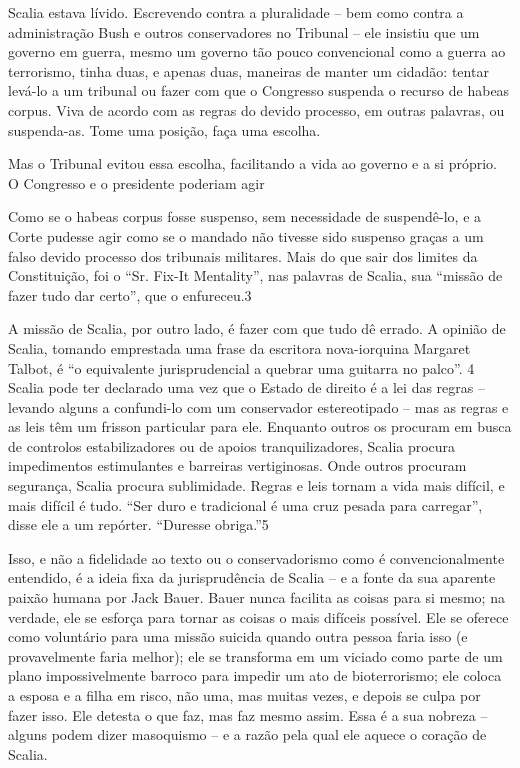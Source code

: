  \par 
Scalia estava lívido. Escrevendo contra a pluralidade – bem como contra a administração Bush e outros conservadores no Tribunal – ele insistiu que um governo em guerra, mesmo um governo tão pouco convencional como a guerra ao terrorismo, tinha duas, e apenas duas, maneiras de manter um cidadão: tentar levá-lo a um tribunal ou fazer com que o Congresso suspenda o recurso de habeas corpus. Viva de acordo com as regras do devido processo, em outras palavras, ou suspenda-as. Tome uma posição, faça uma escolha.
 \par 
Mas o Tribunal evitou essa escolha, facilitando a vida ao governo e a si próprio. O Congresso e o presidente poderiam agir
 \par 
Como se o habeas corpus fosse suspenso, sem necessidade de suspendê-lo, e a Corte pudesse agir como se o mandado não tivesse sido suspenso graças a um falso devido processo dos tribunais militares. Mais do que sair dos limites da Constituição, foi o “Sr. Fix-It Mentality”, nas palavras de Scalia, sua “missão de fazer tudo dar certo”, que o enfureceu.{\color{blue}3}
 \par 
A missão de Scalia, por outro lado, é fazer com que tudo dê errado. A opinião de Scalia, tomando emprestada uma frase da escritora nova-iorquina Margaret Talbot, é “o equivalente jurisprudencial a quebrar uma guitarra no palco”. {\color{blue}4} Scalia pode ter declarado uma vez que o Estado de direito é a lei das regras – levando alguns a confundi-lo com um conservador estereotipado – mas as regras e as leis têm um frisson particular para ele. Enquanto outros os procuram em busca de controlos estabilizadores ou de apoios tranquilizadores, Scalia procura impedimentos estimulantes e barreiras vertiginosas. Onde outros procuram segurança, Scalia procura sublimidade. Regras e leis tornam a vida mais difícil, e mais difícil é tudo. “Ser duro e tradicional é uma cruz pesada para carregar”, disse ele a um repórter. “Duresse obriga.”{\color{blue}5}
 \par 
Isso, e não a fidelidade ao texto ou o conservadorismo como é convencionalmente entendido, é a ideia fixa da jurisprudência de Scalia – e a fonte da sua aparente paixão humana por Jack Bauer. Bauer nunca facilita as coisas para si mesmo; na verdade, ele se esforça para tornar as coisas o mais difíceis possível. Ele se oferece como voluntário para uma missão suicida quando outra pessoa faria isso (e provavelmente faria melhor); ele se transforma em um viciado como parte de um plano impossivelmente barroco para impedir um ato de bioterrorismo; ele coloca a esposa e a filha em risco, não uma, mas muitas vezes, e depois se culpa por fazer isso. Ele detesta o que faz, mas faz mesmo assim. Essa é a sua nobreza – alguns podem dizer masoquismo – e a razão pela qual ele aquece o coração de Scalia.
